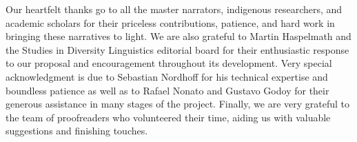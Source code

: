  
Our heartfelt thanks go to all the master narrators, indigenous researchers, and academic scholars for their priceless contributions, patience, and hard work in bringing these narratives to light. We are also grateful to Martin Haspelmath and  the Studies in Diversity Linguistics editorial board for their enthusiastic response to our proposal and encouragement throughout its development. Very special acknowledgment is due to Sebastian Nordhoff for his technical expertise and boundless patience as well as to Rafael Nonato and Gustavo Godoy for their generous assistance in many stages of the project. Finally, we are very grateful to the team of proofreaders who volunteered their time, aiding us with valuable suggestions and finishing touches.